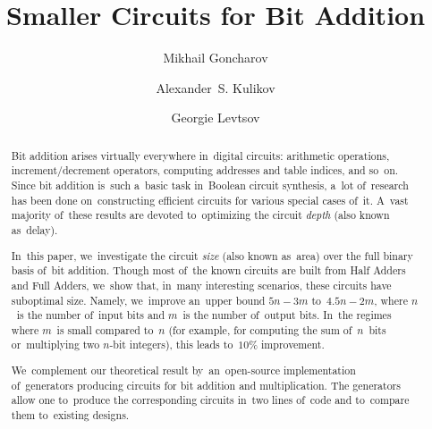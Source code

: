 \documentclass[a4paper, UKenglish, cleveref, autoref,  thm-restate]{lipics-v2021}
\title{Smaller Circuits for Bit Addition} %
\author{Mikhail Goncharov}{Neapolis University Pafos and JetBrains Research}{}{}{}
\author{Alexander~S. Kulikov}{JetBrains Research\and \url{https://alexanderskulikov.github.io}}{alexander.s.kulikov@gmail.com}{https://orcid.org/0000-0002-5656-0336}{}
\author{Georgie Levtsov}{Neapolis University Pafos and JetBrains Research}{}{}{}
\begin{document}
    \maketitle

    \begin{abstract}
        Bit addition arises virtually everywhere in~digital circuits:
        arithmetic operations,
        increment/decrement operators,
        computing addresses and table indices, and so~on.
        Since bit addition is~such a~basic task in~Boolean circuit synthesis,
        a~lot of~research has been done on~constructing efficient circuits
        for various special cases of~it. A~vast majority of~these results are devoted to~optimizing the circuit \emph{depth} (also known as~delay).

        In~this paper, we~investigate the circuit \emph{size} (also known as~area)
        over the full binary basis of~bit addition. Though most of~the known circuits are built from Half Adders and Full Adders,
        we~show that, in~many interesting scenarios, these circuits have suboptimal size.
        Namely, we~improve an~upper bound $5n-3m$ to~$4.5n-2m$,
        where $n$~is the number of~input bits and $m$~is the number of~output bits.
        In~the regimes where $m$~is small compared to~$n$
        (for example, for computing the sum
        of~$n$~bits or~multiplying two $n$-bit integers),
        this leads to~$10\%$ improvement.

        We~complement our theoretical result by~an~open-source implementation
        of~generators producing circuits for bit addition and multiplication.
        The generators allow one to~produce the corresponding circuits
        in~two lines of~code and to~compare them to~existing designs.
    \end{abstract}

    \clearpage
\end{document}
